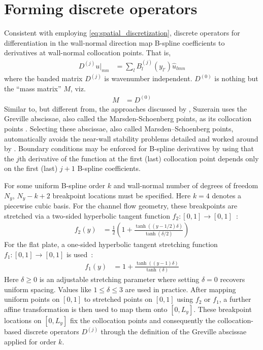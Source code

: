 \documentclass[letterpaper,11pt,nointlimits,reqno,draft]{amsbook}
\begin{document}
\section{Forming discrete operators}
\label{sec:formingoperators}

Consistent with employing \eqref{eq:spatial_discretization}, discrete operators
for differentiation in the wall-normal direction map B-spline coefficients to
derivatives at wall-normal collocation points.  That is,
\begin{align}
  D^{(j)} u\bigr|_{m n}
&= \sum_{l} B^{(j)}_l\!\left(y_{l'}\right)
   \hat{u}_{l m n}
\end{align}
where the banded matrix $D^{(j)}$ is wavenumber independent.  $D^{(0)}$ is
nothing but the ``mass matrix'' $M$, viz.
\begin{align}
  M &= D^{(0)}
\end{align}
Similar to, but different from, the approaches discussed by
\citet[\textsection{}2.1.3]{Kwok2001}, Suzerain uses the Greville abscissae,
also called the Marsden-Schoenberg points, as its collocation points
\citep{Johnson2005Higher,Botella2003Bspline}.  Selecting these abscissae, also
called Marsden--Schoenberg points, automatically avoids the near-wall stability
problems detailed and worked around by \citet[\textsection{}4.4]{Kwok2001}.
Boundary conditions may be enforced for B-spline derivatives by using that the
$j$th derivative of the function at the first (last) collocation point depends
only on the first (last) $j+1$ B-spline coefficients.

For some uniform B-spline order $k$ and wall-normal number of degrees of
freedom $N_y$, $N_y - k + 2$ breakpoint locations must be specified.  Here
$k=4$ denotes a piecewise cubic basis.  For the channel flow geometry, these
breakpoints are stretched via a two-sided hyperbolic tangent function
$f_2:\left[0,1\right]\to\left[0,1\right]$~\citep{Vinokur1983Onedimensional}:
\begin{align}\label{eq:htstretch2}
  f_2\!\left(y\right) &= \frac{1}{2}\left(1 + \frac{
      \tanh\left(\left(y-1/2\right)\delta\right)
  }{
      \tanh\left(\delta/2\right)
  }\right)
\end{align}
For the flat plate, a one-sided hyperbolic tangent stretching
function $f_1:\left[0,1\right]\to\left[0,1\right]$
is used~\citep{Vinokur1983Onedimensional}:
\begin{align}\label{eq:htstretch1}
  f_1\!\left(y\right) &= 1 + \frac{
      \tanh\left(\left(y-1\right)\delta\right)
  }{
      \tanh\left(\delta\right)
  }
\end{align}
Here $\delta\geq{}0$ is an adjustable stretching parameter where setting
$\delta=0$ recovers uniform spacing.  Values like $1\leq{}\delta\leq{}3$ are
used in practice.  After mapping uniform points on $\left[0,1\right]$ to
stretched points on $\left[0,1\right]$ using $f_2$ or $f_1$, a further affine
transformation is then used to map them onto $\left[0, L_y\right]$.  These
breakpoint locations on $\left[0, L_y\right]$ fix the collocation points and
consequently the collocation-based discrete operators $D^{(j)}$ through the
definition of the Greville abscissae applied for order $k$.
\end{document}
